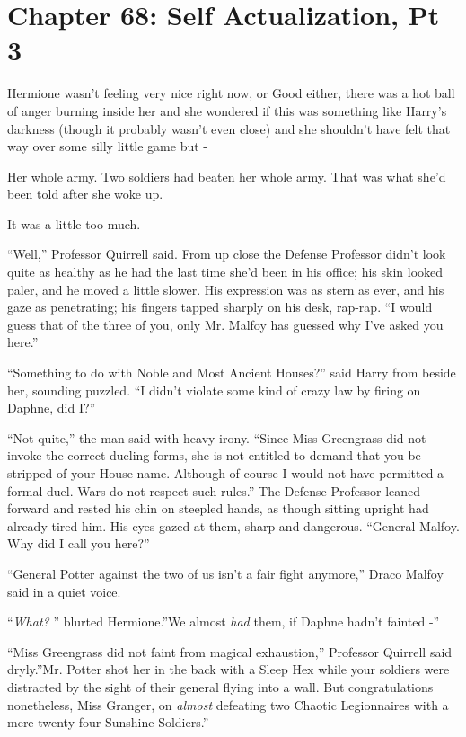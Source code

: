 \chapter{Chapter 68: Self Actualization, Pt 3}
Hermione wasn't feeling very nice right now, or Good either, there was a
hot ball of anger burning inside her and she wondered if this was
something like Harry's darkness (though it probably wasn't even close)
and she shouldn't have felt that way over some silly little game but -

Her whole army. Two soldiers had beaten her whole army. That was what
she'd been told after she woke up.

It was a little too much.

``Well,'' Professor Quirrell said. From up close the Defense Professor
didn't look quite as healthy as he had the last time she'd been in his
office; his skin looked paler, and he moved a little slower. His
expression was as stern as ever, and his gaze as penetrating; his
fingers tapped sharply on his desk, rap-rap. ``I would guess that of the
three of you, only Mr. Malfoy has guessed why I've asked you here.''

``Something to do with Noble and Most Ancient Houses?'' said Harry from
beside her, sounding puzzled. ``I didn't violate some kind of crazy law
by firing on Daphne, did I?''

``Not quite,'' the man said with heavy irony. ``Since Miss Greengrass
did not invoke the correct dueling forms, she is not entitled to demand
that you be stripped of your House name. Although of course I would not
have permitted a formal duel. Wars do not respect such rules.'' The
Defense Professor leaned forward and rested his chin on steepled hands,
as though sitting upright had already tired him. His eyes gazed at them,
sharp and dangerous. ``General Malfoy. Why did I call you here?''

``General Potter against the two of us isn't a fair fight anymore,''
Draco Malfoy said in a quiet voice.

``\emph{What?} '' blurted Hermione.''We almost \emph{had} them, if Daphne
hadn't fainted -''

``Miss Greengrass did not faint from magical exhaustion,'' Professor
Quirrell said dryly.''Mr. Potter shot her in the back with a Sleep Hex
while your soldiers were distracted by the sight of their general flying
into a wall. But congratulations nonetheless, Miss Granger, on
\emph{almost} defeating two Chaotic Legionnaires with a mere twenty-four
Sunshine Soldiers.''


